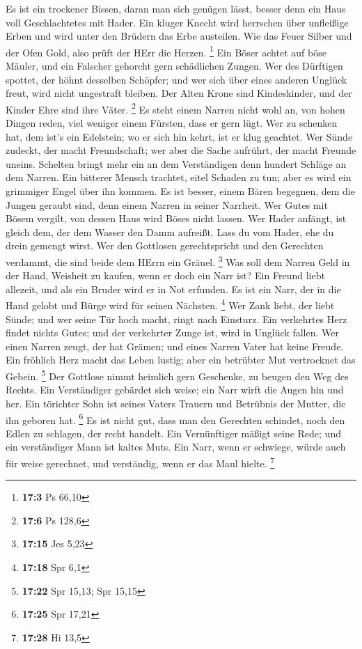  Es ist ein trockener Bissen, daran man sich genügen
lässt, besser denn ein Haus voll Geschlachtetes mit Hader.
 Ein kluger Knecht wird herrschen über unfleißige Erben
und wird unter den Brüdern das Erbe austeilen.  Wie das
Feuer Silber und der Ofen Gold, also prüft der HErr die Herzen.
\footnote{\textbf{17:3} Ps 66,10}  Ein Böser achtet auf
böse Mäuler, und ein Falscher gehorcht gern schädlichen Zungen.
 Wer des Dürftigen spottet, der höhnt desselben Schöpfer;
und wer sich über eines anderen Unglück freut, wird nicht ungestraft
bleiben.  Der Alten Krone sind Kindeskinder, und der
Kinder Ehre sind ihre Väter. \footnote{\textbf{17:6} Ps 128,6}
 Es steht einem Narren nicht wohl an, von hohen Dingen
reden, viel weniger einem Fürsten, dass er gern lügt.  Wer
zu schenken hat, dem ist's ein Edelstein; wo er sich hin kehrt, ist er
klug geachtet.  Wer Sünde zudeckt, der macht Freundschaft;
wer aber die Sache aufrührt, der macht Freunde uneins. 
Schelten bringt mehr ein an dem Verständigen denn hundert Schläge an dem
Narren.  Ein bitterer Mensch trachtet, eitel Schaden zu
tun; aber es wird ein grimmiger Engel über ihn kommen. 
Es ist besser, einem Bären begegnen, dem die Jungen geraubt sind, denn
einem Narren in seiner Narrheit.  Wer Gutes mit Bösem
vergilt, von dessen Haus wird Böses nicht lassen.  Wer
Hader anfängt, ist gleich dem, der dem Wasser den Damm aufreißt. Lass du
vom Hader, ehe du drein gemengt wirst.  Wer den Gottlosen
gerechtspricht und den Gerechten verdammt, die sind beide dem HErrn ein
Gräuel. \footnote{\textbf{17:15} Jes 5,23}  Was soll dem
Narren Geld in der Hand, Weisheit zu kaufen, wenn er doch ein Narr ist?
 Ein Freund liebt allezeit, und als ein Bruder wird er in
Not erfunden.  Es ist ein Narr, der in die Hand gelobt
und Bürge wird für seinen Nächsten. \footnote{\textbf{17:18} Spr 6,1}
 Wer Zank liebt, der liebt Sünde; und wer seine Tür hoch
macht, ringt nach Einsturz.  Ein verkehrtes Herz findet
nichts Gutes; und der verkehrter Zunge ist, wird in Unglück fallen.
 Wer einen Narren zeugt, der hat Grämen; und eines Narren
Vater hat keine Freude.  Ein fröhlich Herz macht das
Leben lustig; aber ein betrübter Mut vertrocknet das Gebein. \footnote{\textbf{17:22}
  Spr 15,13; Spr 15,15}  Der Gottlose nimmt heimlich gern
Geschenke, zu beugen den Weg des Rechts.  Ein
Verständiger gebärdet sich weise; ein Narr wirft die Augen hin und her.
 Ein törichter Sohn ist seines Vaters Trauern und
Betrübnis der Mutter, die ihn geboren hat. \footnote{\textbf{17:25} Spr
  17,21}  Es ist nicht gut, dass man den Gerechten
schindet, noch den Edlen zu schlagen, der recht handelt. 
Ein Vernünftiger mäßigt seine Rede; und ein verständiger Mann ist kaltes
Muts.  Ein Narr, wenn er schwiege, würde auch für weise
gerechnet, und verständig, wenn er das Maul hielte. \footnote{\textbf{17:28}
  Hi 13,5}

